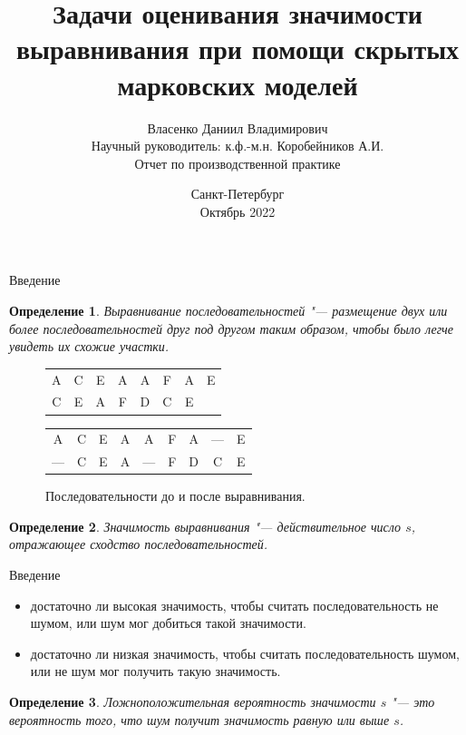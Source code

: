 \documentclass{beamer}
\title[Оценивание значимости выравнивания]{Задачи оценивания значимости выравнивания при помощи скрытых марковских моделей}
\author[Власенко Даниил]{Власенко Даниил Владимирович \\ Научный руководитель: к.ф.-м.н. Коробейников А.И.\\ \vspace{1cm} Отчет по производственной практике}
\date[Декабрь 2021]{Санкт-Петербург\\Октябрь 2022}
\institute[]{Санкт-Петербургский государственный университет\\ Кафедра "Статистического моделирования"}
\newtheorem{defenition}{Определение}
\begin{document}
	\begin{frame}
		\titlepage
	\end{frame}

	\begin{frame}{Введение}
		\begin{defenition}
			Выравнивание последовательностей  "--- размещение двух или более последовательностей друг под другом таким образом, чтобы было легче увидеть их схожие участки.
		\end{defenition}
	
		\begin{figure}
			\begin{tabular}{cccccccc}
				A&C&E&A&A&F&A&E\\
				C&E&A&F&D&C&E&\\
			\end{tabular}
		\end{figure}
		\begin{figure}
			\begin{tabular}{ccccccccc}
				A&C&E&A&A&F&A&—&E\\
				—&C&E&A&—&F&D&C&E\\
			\end{tabular}
			\caption{Последовательности до и после выравнивания.} \label{fg:1}
		\end{figure}
	
		\begin{defenition}
			Значимость выравнивания "--- действительное число $s$, отражающее сходство последовательностей.
		\end{defenition}
	\end{frame}

	\begin{frame}{Введение}
		\begin{itemize}
			\item достаточно ли высокая значимость, чтобы считать последовательность не шумом, или шум мог добиться такой значимости.
			\item достаточно ли низкая значимость, чтобы считать последовательность шумом, или не шум мог получить такую значимость. 
		\end{itemize}
	
		\begin{defenition}
			Ложноположительная вероятность значимости $s$ "--- это вероятность того, что шум получит значимость равную или выше $s$. 
		\end{defenition}
	\end{frame}
\end{document}
